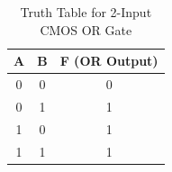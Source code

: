 \documentclass[a4paper,12pt]{article}
\begin{document}
	\begin{table}[H]
		\centering
		\caption{Truth Table for 2-Input CMOS OR Gate}
		\begin{tabular}{|c|c|c|}
			\hline
			\textbf{A} & \textbf{B} & \textbf{F (OR Output)} \\ \hline
			0          & 0          & 0                       \\ \hline
			0          & 1          & 1                       \\ \hline
			1          & 0          & 1                       \\ \hline
			1          & 1          & 1                       \\ \hline
		\end{tabular}
		
		\label{tab:and_gate}
	\end{table}
	\newpage
\end{document}
